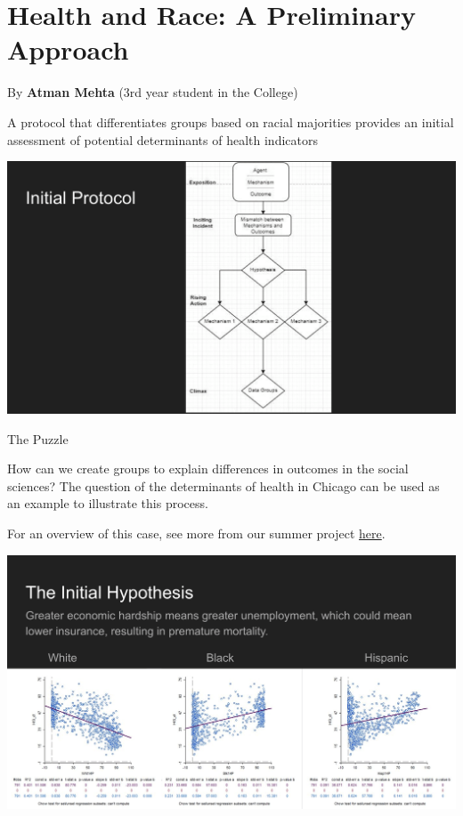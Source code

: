 \documentclass[
]{book}
\begin{document}
\hypertarget{health-and-race-a-preliminary-approach}{%
\section{Health and Race: A Preliminary Approach}\label{health-and-race-a-preliminary-approach}}

By \textbf{Atman Mehta} (3rd year student in the College)

A protocol that differentiates groups based on racial majorities provides an initial assessment of potential determinants of health indicators

\includegraphics{images/health1.png}

The Puzzle

How can we create groups to explain differences in outcomes in the social sciences? The question of the determinants of health in Chicago can be used as an example to illustrate this process.

For an overview of this case, see more from our summer project \href{https://uchicago.box.com/s/ganfzzmzonoaqc1of2kzzkw67pgg7csw}{here}.

\includegraphics{images/health2.png}
\end{document}
